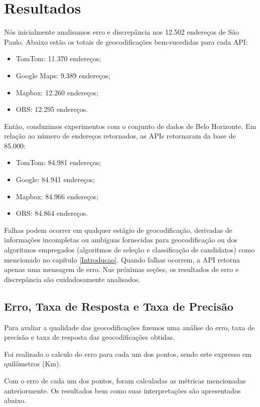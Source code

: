 \chapter{Resultados} \label{resultado}

Nós inicialmente analisamos erro e discrepância nos 12.502 endereços de São Paulo. Abaixo estão os totais de geocodificações bem-sucedidas para cada API:

\begin{itemize}
    \item TomTom: 11.370 endereços;
    \item Google Maps: 9.389 endereços;
    \item Mapbox: 12.260 endereços;
    \item ORS: 12.295 endereços.
\end{itemize}

Então, conduzimos experimentos com o conjunto de dados de Belo Horizonte. Em relação ao número de endereços retornados, as APIs retornaram da base de 85.000:

\begin{itemize}
    \item TomTom: 84.981 endereços;
    \item Google: 84.941 endereços;
    \item Mapbox: 84.966 endereços; 
    \item ORS: 84.864 endereços.
\end{itemize}    

Falhas podem ocorrer em qualquer estágio de geocodificação, derivadas de informações incompletas ou ambíguas fornecidas para geocodificação ou dos algoritmos empregados (algoritmos de seleção e classificação de candidatos) como mencionado no capítulo \ref{Introducao}. Quando falhas ocorrem, a API retorna apenas uma mensagem de erro. Nas próximas seções, os resultados de erro e discrepância são cuidadosamente analisados.

\section{Erro, Taxa de Resposta e Taxa de Precisão}

Para avaliar a qualidade das geocodificações fizemos uma análise do erro, taxa de precisão e taxa de resposta das geocodificações obtidas. 

Foi realizado o calculo do erro para cada um dos pontos, sendo este expresso em quilômetros (Km).

Com o erro de cada um dos pontos, foram calculadas as métricas mencionadas anteriormente. Os resultados bem como suas interpretações são apresentados abaixo.


